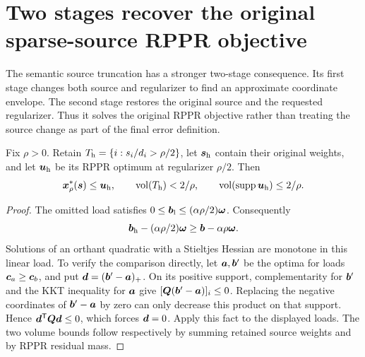 \section{Two stages recover the original sparse-source RPPR objective}
\label{sec:revisit-general-rppr}
The semantic source truncation has a stronger two-stage consequence.
Its first stage changes both source and regularizer to find an approximate
coordinate envelope. The second stage restores the original source and the
requested regularizer. Thus it solves the original RPPR objective rather
than treating the source change as part of the final error definition.

\begin{lemma}
\label{lem:revisit-source-envelope}
Fix $\rho>0$. Retain $T_{\rm h}=\{i:s_i/d_i>\rho/2\}$, let
$\bm{s}_{\rm h}$ contain their original weights, and let $\bm{u}_{\rm h}$
be its RPPR optimum at regularizer $\rho/2$. Then
\begin{equation}
 \bm{x}_\rho^*(\bm{s})\leq\bm{u}_{\rm h},\qquad
 \operatorname{vol}(T_{\rm h})<2/\rho,\qquad
 \operatorname{vol}(\operatorname{supp}\bm{u}_{\rm h})\leq2/\rho.
 \label{eq:revisit-source-envelope}
\end{equation}
\end{lemma}
\begin{proof}
The omitted load satisfies
$0\leq\bm{b}_{\rm l}\leq(\alpha\rho/2)\bm{\omega}$.
Consequently
\[
 \bm{b}_{\rm h}-(\alpha\rho/2)\bm{\omega}
 \geq\bm{b}-\alpha\rho\bm{\omega}.
\]
Solutions of an orthant quadratic with a Stieltjes Hessian are monotone
in this linear load. To verify the comparison directly, let $\bm{a},\bm{b}'$ be
the optima for loads $\bm{c}_a\geq\bm{c}_b$, and put
$\bm{d}=(\bm{b}'-\bm{a})_+$. On its positive support, complementarity for
$\bm{b}'$ and the KKT inequality for $\bm{a}$ give
$[\bm{Q}(\bm{b}'-\bm{a})]_i\leq0$.
Replacing the negative coordinates of $\bm{b}'-\bm{a}$ by zero can only decrease
this product on that support. Hence $\bm{d}^{\mathsf{T}}\bm{Q}\bm{d}\leq0$,
which forces $\bm{d}=0$.
Apply this fact to the displayed loads. The two volume bounds follow
respectively by summing retained source weights and by RPPR residual mass.
\end{proof}

